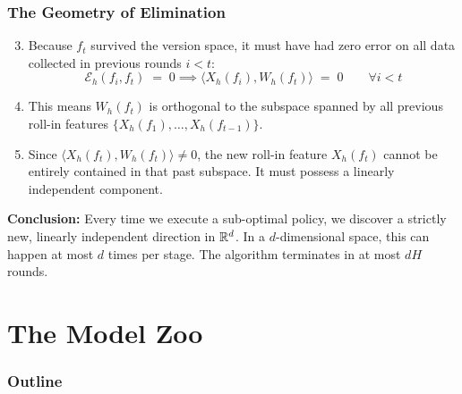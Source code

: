 \documentclass[aspectratio=169]{beamer}
\begin{document}
\begin{frame}\frametitle{The Geometry of Elimination}



\begin{enumerate}
    \setcounter{enumi}{2}
    \item Because $f_t$ survived the version space, it must have had zero error on all data collected in previous rounds $i < t$:
    \[
    \mathcal{E}_h(f_i, f_t) \;=\; 0 \implies \langle X_h(f_i), W_h(f_t) \rangle \;=\; 0 \qquad \forall i < t
    \]
    \pause
    \item This means $W_h(f_t)$ is orthogonal to the subspace spanned by all previous roll-in features $\{X_h(f_1), \dots, X_h(f_{t-1})\}$.
    \pause
    \item Since $\langle X_h(f_t), W_h(f_t) \rangle \neq 0$, the new roll-in feature $X_h(f_t)$ cannot be entirely contained in that past subspace. It must possess a linearly independent component.
\end{enumerate}

\vspace{0.4cm}
\pause
\textbf{Conclusion:}
Every time we execute a sub-optimal policy, we discover a strictly new, linearly independent direction in $\mathbb{R}^d$. In a $d$-dimensional space, this can happen at most $d$ times per stage. The algorithm terminates in at most $dH$ rounds.
\end{frame}

\section{The Model Zoo}

\begin{frame}[noframenumbering]
  \frametitle{Outline}
  \tableofcontents[currentsection]
\end{frame}
\end{document}
